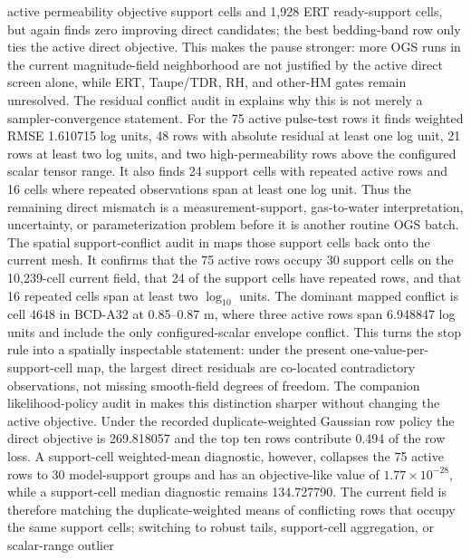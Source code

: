 active permeability objective support cells and 1,928 ERT ready-support cells, but
again finds zero improving direct candidates; the best bedding-band row only ties
the active direct objective.  This makes the pause stronger: more OGS runs in the
current magnitude-field neighborhood are not justified by the active direct screen
alone, while ERT, Taupe/TDR, RH, and other-HM gates remain unresolved.
The residual conflict audit in
 explains why this
is not merely a sampler-convergence statement.  For the 75 active pulse-test rows it
finds weighted RMSE 1.610715 log units, 48 rows with absolute residual at least one
log unit, 21 rows at least two log units, and two high-permeability rows above the
configured scalar tensor range.  It also finds 24 support cells with repeated active
rows and 16 cells where repeated observations span at least one log unit.  Thus the
remaining direct mismatch is a measurement-support, gas-to-water interpretation,
uncertainty, or parameterization problem before it is another routine OGS batch.
The spatial support-conflict audit in
 maps those
support cells back onto the current  mesh.  It confirms that the 75
active rows occupy 30 support cells on the 10,239-cell current field, that 24 of the
support cells have repeated rows, and that 16 repeated cells span at least two
\(\log_{10}\) units.  The dominant mapped conflict is cell 4648 in BCD-A32 at
0.85--0.87 m, where three active rows span 6.948847 log units and include the only
configured-scalar envelope conflict.  This turns the stop rule into a spatially
inspectable statement: under the present one-value-per-support-cell map, the largest
direct residuals are co-located contradictory observations, not missing smooth-field
degrees of freedom.
The companion likelihood-policy audit in
 makes this
distinction sharper without changing the active objective.  Under the recorded
duplicate-weighted Gaussian row policy the direct objective is 269.818057 and the
top ten rows contribute 0.494 of the row loss.  A support-cell weighted-mean
diagnostic, however, collapses the 75 active rows to 30 model-support groups and
has an objective-like value of \(1.77\times10^{-28}\), while a support-cell median
diagnostic remains 134.727790.  The current field is therefore matching the
duplicate-weighted means of conflicting rows that occupy the same support cells;
switching to robust tails, support-cell aggregation, or scalar-range outlier
